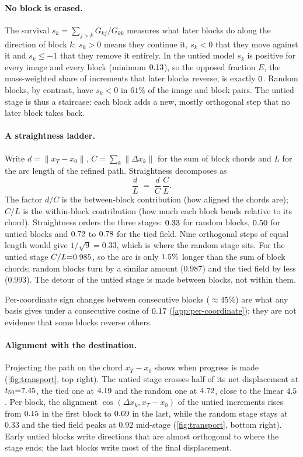 \paragraph{No block is erased.}
The survival $s_k=\sum_{j>k}G_{kj}/G_{kk}$ measures what later blocks do along the
direction of block $k$: $s_k>0$ means they continue it, $s_k<0$ that they move against
it and $s_k\le-1$ that they remove it entirely.
In the untied model $s_k$ is positive for every image and every block (minimum
$0.13$), so the opposed fraction $E$, the mass-weighted share of increments that
later blocks reverse, is exactly $0$.
Random blocks, by contrast, have $s_k<0$ in $61\%$ of the image and block pairs.
The untied stage is thus a staircase: each block adds a new, mostly orthogonal step
that no later block takes back.

\paragraph{A straightness ladder.}
Write $d=\|x_T-x_0\|$, $C=\sum_k\|\Delta x_k\|$ for the sum of block chords and $L$ for
the arc length of the refined path.
Straightness decomposes as
\begin{equation}
    \frac{d}{L} \;=\; \frac{d}{C}\,\frac{C}{L}.
    \label{eq:straightness-decomp}
\end{equation}
The factor $d/C$ is the between-block contribution (how aligned the chords are); $C/L$
is the within-block contribution (how much each block bends relative to its chord).
Straightness orders the three stages: $0.33$ for random blocks, $0.50$ for
untied blocks and $0.72$ to $0.78$ for the tied field.
Nine orthogonal steps of equal length would give $1/\sqrt 9{=}0.33$, which is where the
random stage sits.
For the untied stage $C/L{=}0.985$, so the arc is only
$1.5\%$ longer than the sum of block chords; random blocks turn by a
similar amount ($0.987$) and the tied field by less ($0.993$).
The detour of the untied stage is made between blocks, not within them.

Per-coordinate sign changes between consecutive blocks ($\approx 45\%$) are what any
basis gives under a consecutive cosine of $0.17$ (\cref{app:per-coordinate});
they are not evidence that some blocks reverse others.

\paragraph{Alignment with the destination.}
Projecting the path on the chord $x_T-x_0$ shows when progress is made
(\cref{fig:transport}, top right).
The untied stage crosses half of its net displacement at $t_{50}{=}7.45$, the
tied one at $4.19$ and the random one at $4.72$, close to the linear
$4.5$.
Per block, the alignment $\cos(\Delta x_k,x_T-x_0)$ of the untied increments rises
from $0.15$ in the first block to $0.69$ in the last, while
the random stage stays at $0.33$ and the tied field peaks at $0.92$ mid-stage
(\cref{fig:transport}, bottom right).
Early untied blocks write directions that are almost orthogonal to where the stage
ends; the last blocks write most of the final displacement.

